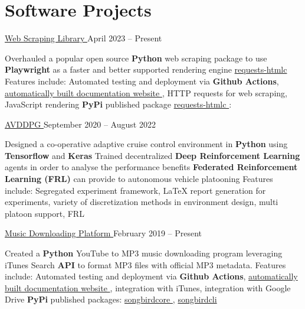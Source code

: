 \documentclass[a4paper,11pt]{article}
\newcommand{\github}{cboin1996} %
\begin{document}
\section{Software Projects}
\begin{subheading}
	\resumeProject
	{\href{https://github.com/cboin1996/requests-html}{Web Scraping Library \footnotesize{\faExternalLink}}} %
	{April 2023 -- Present} %
	\begin{entries}
        \ib Overhauled a popular open source \textbf{Python} web scraping package
        to use \textbf{Playwright} as a faster and better
        supported rendering engine
        \href{https://pypi.org/project/requests-htmlc/}{requests-htmlc \faExternalLink} 
        \ib Features include: Automated testing and deployment via \textbf{Github Actions}, \href{https://cboin1996.github.io/requests-html/latest/}{automatically built documentation website \faExternalLink},
        HTTP requests for web scraping, JavaScript rendering
        \ib \textbf{PyPi} published package \href{https://pypi.org/project/requests-htmlc/}{requests-htmlc \faExternalLink}:
	\end{entries}
	\resumeProject
	{\href{https://github.com/\github/avddpg}{AVDDPG \footnotesize{\faExternalLink}}}
	{September 2020 -- August 2022} %
	\begin{entries}
		\ib Designed a co-operative adaptive cruise control environment in \textbf{Python} using \textbf{Tensorflow} and
		\textbf{Keras}
		\ib Trained decentralized \textbf{Deep Reinforcement Learning} agents in order to analyse the performance benefits \textbf{Federated Reinforcement Learning (FRL)}
		can provide to autonomous vehicle platooning
		\ib Features include: Segregated experiment framework, \LaTeX \hspace{0.5pt} report generation for experiments,
		variety of discretization methods in environment design, multi platoon support, FRL
	\end{entries}

	\resumeProject
	{\href{https://github.com/cboin1996/songbird}{Music Downloading Platform \footnotesize{\faExternalLink}}} %
	{February 2019 -- Present} %
	\begin{entries}
		\ib Created a \textbf{Python} YouTube to MP3 music downloading program leveraging iTunes Search \textbf{API} to format
        MP3 files with official MP3 metadata.
        \ib Features include: Automated testing and deployment via \textbf{Github Actions}, \href{https://cboin1996.github.io/songbird/latest/}{automatically built documentation website \faExternalLink}, integration with iTunes,
        integration with Google Drive
        \ib \textbf{PyPi} published packages: \href{https://pypi.org/project/songbirdcore/}{songbirdcore \faExternalLink}, \href{https://pypi.org/project/songbirdcli/}{songbirdcli \faExternalLink}
	\end{entries}

\end{subheading}
\end{document}
